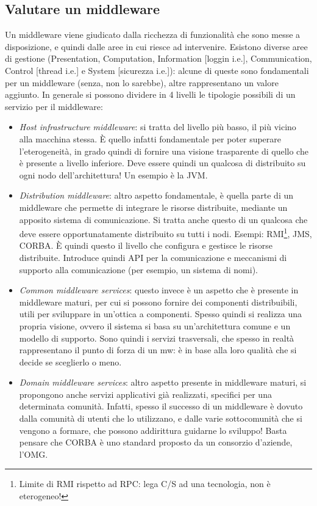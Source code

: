 \subsection{Valutare un middleware}
Un middleware viene giudicato dalla ricchezza di funzionalità che sono messe a disposizione, e quindi dalle aree in
cui riesce ad intervenire. Esistono diverse aree di gestione (Presentation, Computation, Information [loggin i.e.],
Communication, Control [thread i.e.] e System [sicurezza i.e.]): alcune di queste sono fondamentali per un middleware
(senza, non lo sarebbe), altre rappresentano un valore aggiunto.
In generale si possono dividere in 4 livelli le tipologie possibili di un servizio per il middleware:
\begin{itemize}
 \item \textit{Host infrastructure middleware}: si tratta del livello più basso, il più vicino alla macchina stessa.
 È quello infatti fondamentale per poter superare l'eterogeneità, in grado quindi di fornire una visione trasparente
 di quello che è presente a livello inferiore. Deve essere quindi un qualcosa di distribuito su ogni nodo
 dell'architettura! Un esempio è la JVM.
 \item \textit{Distribution middleware}: altro aspetto fondamentale, è quella parte di un middleware che permette di
 integrare le risorse distribuite, mediante un apposito sistema di comunicazione. Si tratta anche questo di un
 qualcosa che deve essere opportunatamente distribuito su tutti i nodi. Esempi: RMI\footnote{Limite di RMI rispetto
 ad RPC: lega C/S ad una tecnologia, non è eterogeneo!}, JMS, CORBA. È quindi questo il livello che configura e
 gestisce le risorse distribuite. Introduce quindi API per la comunicazione e meccanismi  di supporto alla
 comunicazione (per esempio, un sistema di nomi).
 \item \textit{Common middleware services}: questo invece è un aspetto che è presente in middleware maturi, per cui si
 possono fornire dei componenti distribuibili, utili per sviluppare in un'ottica a componenti. Spesso quindi si realizza
 una propria visione, ovvero il sistema si basa su un'architettura comune e un modello di supporto. Sono quindi i
 servizi trasversali, che spesso in realtà rappresentano il punto di forza di un mw: è in base alla loro qualità
 che si decide se sceglierlo o meno.
 \item \textit{Domain middleware services}: altro aspetto presente in middleware maturi, si propongono anche servizi
 applicativi già realizzati, specifici per una determinata comunità. Infatti, spesso il successo di un middleware è
 dovuto dalla comunità di utenti che lo utilizzano, e dalle varie sottocomunità che si vengono a formare, che possono
 addirittura guidarne lo sviluppo! Basta pensare che CORBA è uno standard proposto da un consorzio d'aziende, l'OMG.
\end{itemize}

